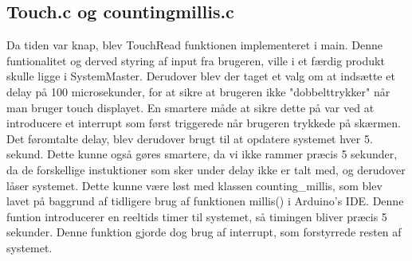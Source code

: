 \subsection{Touch.c og countingmillis.c}
Da tiden var knap, blev TouchRead funktionen implementeret i main. Denne funtionalitet og derved styring af input fra brugeren, ville i et færdig produkt skulle ligge i SystemMaster. Derudover blev der taget et valg om at indsætte et delay på 100 microsekunder, for at sikre at brugeren ikke "dobbelttrykker" når man bruger touch displayet. En smartere måde at sikre dette på var ved at introducere et interrupt som først triggerede når brugeren trykkede på skærmen. Det føromtalte delay, blev derudover brugt til at opdatere systemet hver 5. sekund. Dette kunne også gøres smartere, da vi ikke rammer præcis 5 sekunder, da de forskellige instuktioner som sker under delay ikke er talt med, og derudover låser systemet. Dette kunne være løst med klassen counting\_millis, som blev lavet på baggrund af tidligere brug af funktionen millis() i Arduino's IDE. Denne funtion introducerer en reeltids timer til systemet, så timingen bliver præcis 5 sekunder. Denne funktion gjorde dog brug af interrupt, som forstyrrede resten af systemet.   
